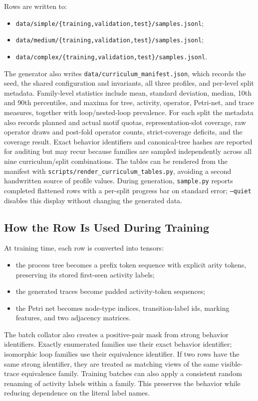 \documentclass[manuscript,screen,nonacm]{acmart}
\begin{document}
Rows are written to:
\begin{itemize}
  \item \texttt{data/simple/\{training,validation,test\}/samples.jsonl};
  \item \texttt{data/medium/\{training,validation,test\}/samples.jsonl};
  \item \texttt{data/complex/\{training,validation,test\}/samples.jsonl}.
\end{itemize}
The generator also writes \texttt{data/curriculum\_manifest.json}, which records the seed,
the shared configuration and invariants, all three profiles, and per-level split
metadata. Family-level statistics include mean, standard deviation, median,
10th and 90th percentiles, and maxima for tree, activity, operator, Petri-net,
and trace measures, together with loop/nested-loop prevalence. For each split
the metadata also records planned and actual motif quotas, representation-slot
coverage, raw operator draws and post-fold operator counts, strict-coverage
deficits, and the coverage result. Exact behavior identifiers and canonical-tree
hashes are reported for auditing but may recur because families are sampled
independently across all nine curriculum/split combinations.
The tables can be rendered from the manifest with
\texttt{scripts/render\_curriculum\_tables.py}, avoiding a second handwritten
source of profile values. During generation, \texttt{sample.py} reports
completed flattened rows with a per-split progress bar on standard error;
\texttt{--quiet} disables this display without changing the generated data.

\subsection{How the Row Is Used During Training}
\label{app:training-use}

At training time, each row is converted into tensors:
\begin{itemize}
  \item the process tree becomes a prefix token sequence with explicit arity
        tokens, preserving its stored first-seen activity labels;
  \item the generated traces become padded activity-token sequences;
  \item the Petri net becomes node-type indices, transition-label ids, marking
        features, and two adjacency matrices.
\end{itemize}
The batch collator also creates a positive-pair mask from strong behavior
identifiers. Exactly enumerated families use their exact behavior identifier;
isomorphic loop families use their equivalence identifier. If two rows have the same strong identifier, they are treated
as matching views of the same visible-trace equivalence family. Training batches
can also apply a consistent random renaming of activity labels within a family.
This preserves the behavior while reducing dependence on the literal label
names.
\end{document}
